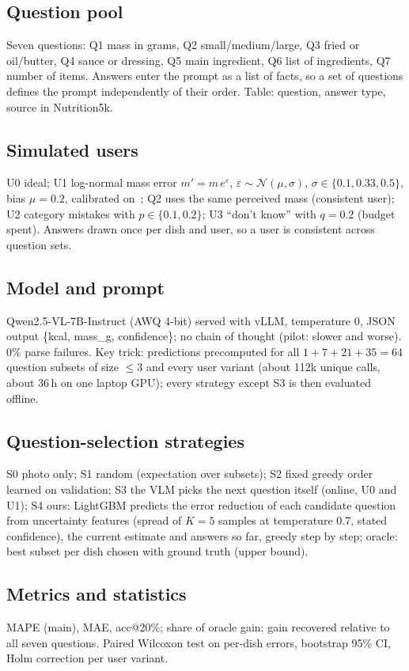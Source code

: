 \documentclass[twocolumn]{svjour3}
\newcommand{\plan}[1]{{\color{blue!70!black}#1}}   %
\begin{document}
\subsection{Question pool}
\plan{Seven questions: Q1 mass in grams, Q2 small/medium/large, Q3 fried or oil/butter, Q4 sauce or
dressing, Q5 main ingredient, Q6 list of ingredients, Q7 number of items. Answers enter the prompt as
a list of facts, so a set of questions defines the prompt independently of their order. Table: question,
answer type, source in Nutrition5k.}

\subsection{Simulated users}
\plan{U0 ideal; U1 log-normal mass error $m' = m\,e^{\varepsilon}$, $\varepsilon\sim\mathcal{N}(\mu,\sigma)$,
$\sigma\in\{0.1, 0.33, 0.5\}$, bias $\mu=0.2$, calibrated on~\cite{lucassen2021portion}; Q2 uses the same
perceived mass (consistent user); U2 category mistakes with $p\in\{0.1,0.2\}$; U3 ``don't know'' with
$q=0.2$ (budget spent). Answers drawn once per dish and user, so a user is consistent across question sets.}

\subsection{Model and prompt}
\plan{Qwen2.5-VL-7B-Instruct (AWQ 4-bit) served with vLLM, temperature 0, JSON output
\{kcal, mass\_g, confidence\}; no chain of thought (pilot: slower and worse). 0\% parse failures.
Key trick: predictions precomputed for all $1+7+21+35=64$ question subsets of size $\le 3$ and every user
variant (about 112k unique calls, about 36\,h on one laptop GPU); every strategy except S3 is then
evaluated offline.}

\subsection{Question-selection strategies}
\plan{S0 photo only; S1 random (expectation over subsets); S2 fixed greedy order learned on validation;
S3 the VLM picks the next question itself (online, U0 and U1); S4 ours: LightGBM predicts the error
reduction of each candidate question from uncertainty features (spread of $K=5$ samples at temperature 0.7,
stated confidence), the current estimate and answers so far, greedy step by step; oracle: best subset per
dish chosen with ground truth (upper bound).}

\subsection{Metrics and statistics}
\plan{MAPE (main), MAE, acc@20\%; share of oracle gain; gain recovered relative to all seven questions.
Paired Wilcoxon test on per-dish errors, bootstrap 95\% CI, Holm correction per user variant.}
\end{document}
